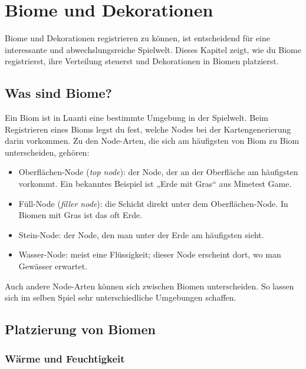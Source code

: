 \chapter{Biome und Dekorationen}
\label{ch:advmap/biomesdeco}

Biome und Dekorationen
registrieren zu können, ist entscheidend für eine interessante und
abwechslungsreiche Spielwelt. Dieses Kapitel zeigt, wie du Biome
registrierst, ihre Verteilung steuerst und Dekorationen in Biomen
platzierst.

\section{Was sind Biome?}\label{was-sind-biome}

Ein Biom ist in Luanti eine bestimmte Umgebung in der Spielwelt. Beim
Registrieren eines Bioms legst du fest, welche Nodes bei der
Kartengenerierung darin
vorkommen. Zu den Node-Arten, die sich am häufigsten von Biom zu Biom
unterscheiden, gehören:

\begin{itemize}
\tightlist
\item
  Oberflächen-Node (\emph{top node}): der Node, der an der Oberfläche am
  häufigsten vorkommt. Ein bekanntes Beispiel ist „Erde mit Gras`` aus
  Minetest Game.
\item
  Füll-Node (\emph{filler node}): die Schicht direkt unter dem
  Oberflächen-Node. In Biomen mit Gras ist das oft Erde.
\item
  Stein-Node: der Node, den man unter der Erde am häufigsten sieht.
\item
  Wasser-Node: meist eine Flüssigkeit; dieser Node erscheint dort, wo
  man Gewässer erwartet.
\end{itemize}

Auch andere Node-Arten können sich zwischen Biomen unterscheiden. So
lassen sich im selben Spiel sehr unterschiedliche Umgebungen schaffen.

\section{Platzierung von Biomen}\label{platzierung-von-biomen}

\subsection{Wärme und Feuchtigkeit}\label{wuxe4rme-und-feuchtigkeit}

